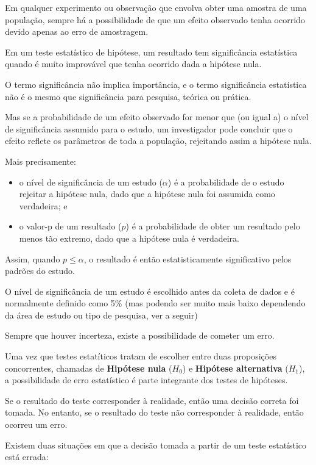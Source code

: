 \documentclass[
]{book}
\begin{document}
Em qualquer experimento ou observação que envolva obter uma amostra de uma população, sempre há a possibilidade de que um efeito observado tenha ocorrido devido apenas ao erro de amostragem.

Em um teste estatístico de hipótese, um resultado tem significância estatística quando é muito improvável que tenha ocorrido dada a hipótese nula.

O termo significância não implica importância, e o termo significância estatística não é o mesmo que significância para pesquisa, teórica ou prática.

Mas se a probabilidade de um efeito observado for menor que (ou igual a) o nível de significância assumido para o estudo, um investigador pode concluir que o efeito reflete os parâmetros de toda a população, rejeitando assim a hipótese nula.

Mais precisamente:

\begin{itemize}
\item
  o nível de significância de um estudo (\(\alpha\)) é a probabilidade de o estudo rejeitar a hipótese nula, dado que a hipótese nula foi assumida como verdadeira; e
\item
  o valor-p de um resultado (\(p\)) é a probabilidade de obter um resultado pelo menos tão extremo, dado que a hipótese nula é verdadeira.
\end{itemize}

Assim, quando \(p\le\alpha\), o resultado é então estatisticamente significativo pelos padrões do estudo.

O nível de significância de um estudo é escolhido antes da coleta de dados e é normalmente definido como 5\% (mas podendo ser muito mais baixo dependendo da área de estudo ou tipo de pesquisa, ver a seguir)

Sempre que houver incerteza, existe a possibilidade de cometer um erro.

Uma vez que testes estatíticos tratam de escolher entre duas proposições concorrentes, chamadas de \textbf{Hipótese nula} (\(H_0\)) e \textbf{Hipótese alternativa} (\(H_1\)), a possibilidade de erro estatístico é parte integrante dos testes de hipóteses.

Se o resultado do teste corresponder à realidade, então uma decisão correta foi tomada. No entanto, se o resultado do teste não corresponder à realidade, então ocorreu um erro.

Existem duas situações em que a decisão tomada a partir de um teste estatístico está errada:
\end{document}
